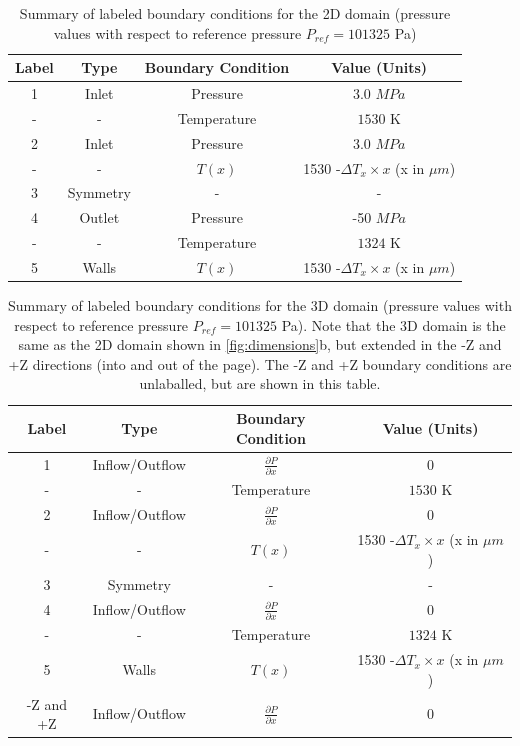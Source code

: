 \documentclass{UCF_ETD}
\begin{document}
\begin{table}[htp!]
\caption{\label{tab:2DboundaryConditions} Summary of labeled boundary conditions for the 2D domain (pressure values with respect to reference pressure $P_{ref} = 101325$ Pa)}
\centering
\begin{tabular}{cccc}
Label &Type& Boundary Condition& Value (Units)\\\hline
1& Inlet&Pressure & 3.0 $MPa$\\
-& -&Temperature& $1530$ K\\
2& Inlet&Pressure& 3.0  $MPa$\\
-& -&$T(x)$& 1530 -$\Delta T_{x}\times x$ (x in $\mu m$)\\
3& Symmetry&- & -\\
4& Outlet&Pressure& -50 $MPa$\\
-& -&Temperature & $1324$ K \\
5& Walls&$T(x)$& 1530 -$\Delta T_{x}\times x$ (x in $\mu m$)\\
\end{tabular}
\end{table}

\begin{table}[htp!]
\caption{\label{tab:3DboundaryConditions} Summary of labeled boundary conditions for the 3D domain (pressure values with respect to reference pressure $P_{ref} = 101325$ Pa). Note that the 3D domain is the same as the 2D domain shown in \ref{fig:dimensions}b, but extended in the -Z and +Z directions (into and out of the page). The -Z and +Z boundary conditions are unlaballed, but are shown in this table.}
\centering
\begin{tabular}{cccc}
Label &Type& Boundary Condition& Value (Units)\\\hline
1& Inflow/Outflow & $\frac{\partial P}{\partial x}$ & 0\\
-& -&Temperature& $1530$ K\\
2& Inflow/Outflow& $\frac{\partial P}{\partial x}$ & 0\\
-& -&$T(x)$& 1530 -$\Delta T_{x}\times x$ (x in $\mu m$)\\
3& Symmetry&- & -\\
4& Inflow/Outflow& $\frac{\partial P}{\partial x}$ & 0\\
-& -&Temperature & $1324$ K \\
5& Walls&$T(x)$& 1530 -$\Delta T_{x}\times x$ (x in $\mu m$)\\
-Z and +Z & Inflow/Outflow& $\frac{\partial P}{\partial x}$ & 0\\

\end{tabular}
\end{table}
\end{document}
